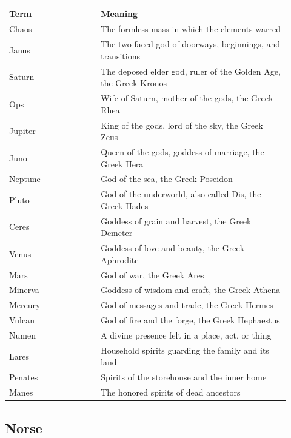 \begin{longtable}{L{0.30\linewidth} L{0.62\linewidth}}
\toprule
\textbf{Term} & \textbf{Meaning} \\
\midrule
\endhead
Chaos & The formless mass in which the elements warred \\
Janus & The two-faced god of doorways, beginnings, and transitions \\
Saturn & The deposed elder god, ruler of the Golden Age, the Greek Kronos \\
Ops & Wife of Saturn, mother of the gods, the Greek Rhea \\
Jupiter & King of the gods, lord of the sky, the Greek Zeus \\
Juno & Queen of the gods, goddess of marriage, the Greek Hera \\
Neptune & God of the sea, the Greek Poseidon \\
Pluto & God of the underworld, also called Dis, the Greek Hades \\
Ceres & Goddess of grain and harvest, the Greek Demeter \\
Venus & Goddess of love and beauty, the Greek Aphrodite \\
Mars & God of war, the Greek Ares \\
Minerva & Goddess of wisdom and craft, the Greek Athena \\
Mercury & God of messages and trade, the Greek Hermes \\
Vulcan & God of fire and the forge, the Greek Hephaestus \\
Numen & A divine presence felt in a place, act, or thing \\
Lares & Household spirits guarding the family and its land \\
Penates & Spirits of the storehouse and the inner home \\
Manes & The honored spirits of dead ancestors \\
\bottomrule
\end{longtable}

\subsection{Norse}

